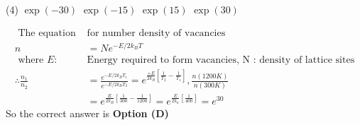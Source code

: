 \begin{enumerate}
\begin{tasks}(4)
\task[\textbf{A.}] $\exp (-30)$
\task[\textbf{B.}] $\exp (-15)$
\task[\textbf{C.}] $\exp (15)$
\task[\textbf{D.}] $\exp (30)$
\end{tasks}
\begin{answer}
$$\begin{aligned}
\text{ The equation }&\text{for number density of vacancies}\\
 n&=N e^{-E / 2 k_{B} T}\\
\text{ where $E$} :& \text{Energy required to form vacancies, $\mathrm{N}$ : density of lattice sites}\\
\therefore \frac{n_{1}}{n_{2}}&=\frac{e^{-E / 2 k_{B} T_{1}}}{e^{-E / 2 k_{B} T_{2}}}=e^{\frac{+E}{2 k_{B}}\left[\frac{1}{T_{2}}-\frac{1}{T_{1}}\right]}, \frac{n(1200 K)}{n(300 K)}\\&=e^{\frac{E}{2 k_{B}}\left[\frac{1}{300}-\frac{1}{1200}\right]}=e^{\frac{E}{2 k_{n}}\left[\frac{1}{400}\right]}=e^{30}
\end{aligned}$$
So the correct answer is \textbf{Option (D)}
\end{answer}
\end{enumerate}